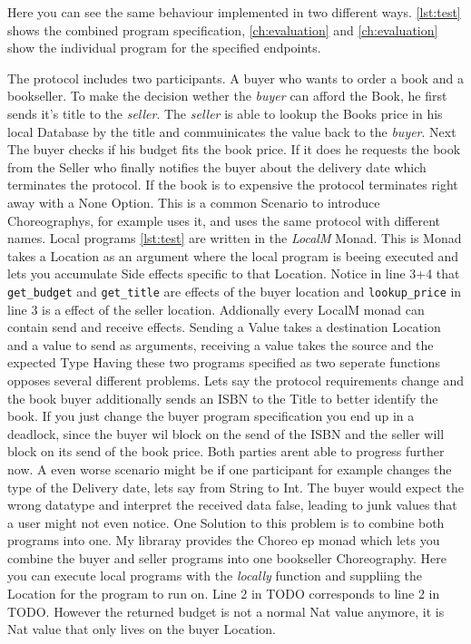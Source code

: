 Here you can see the same behaviour implemented in two different ways. \cref{lst:test} shows the combined program specification, \cref{ch:evaluation} and \cref{ch:evaluation} show the individual program for the specified endpoints.
\par
The protocol includes two participants. A buyer who wants to order a book and a bookseller. To make the decision wether the \emph{buyer} can afford the Book, he first sends it's title to the \emph{seller}. The \emph{seller} is able to lookup the Books price in his local Database by the title and commuinicates the value back to the \emph{buyer}. Next The buyer checks if his budget fits the book price. If it does he requests the book from the Seller who finally notifies the buyer about the delivery date which terminates the protocol. If the book is to expensive the protocol terminates right away with a None Option.
This is a common Scenario to introduce Choreographys, for example \cite{pirouette} uses it, and \cite{gentle-introduction-multiparty-sessiontypes} uses the same protocol with different names.
Local programs \cref{lst:test} are written in the \emph{LocalM} Monad. This is Monad takes a Location as an argument where the local program is beeing executed and lets you accumulate Side effects specific to that Location. Notice in line 3+4 %
that \lstinline!get_budget! and \lstinline!get_title! are effects of the buyer location and \lstinline!lookup_price! in line 3 is a effect of the seller location. Addionally every LocalM monad can contain send and receive effects. Sending a Value takes a destination Location and a value to send as arguments, receiving a value takes the source and the expected Type %
Having these two programs specified as two seperate functions opposes several different problems. Lets say the protocol requirements change and the book buyer additionally sends an ISBN to the Title to better identify the book. If you just change the buyer program specification you end up in a deadlock, since the buyer wil block on the send of the ISBN and the seller will block on its send of the book price. Both parties arent able to progress further now. A even worse scenario might be if one participant for example changes the type of the Delivery date, lets say from String to Int. The buyer would expect the wrong datatype and interpret the received data false, leading to junk values that a user might not even notice.
One Solution to this problem is to combine both programs into one. My libraray provides the Choreo ep monad which lets you combine the buyer and seller programs into one bookseller Choreography. Here you can execute local programs with the \emph{locally} function and suppliing the Location for the program to run on. Line 2 in TODO corresponds to line 2 in TODO. However the returned budget is not a normal Nat value anymore, it is Nat value that only lives on the buyer Location.%
